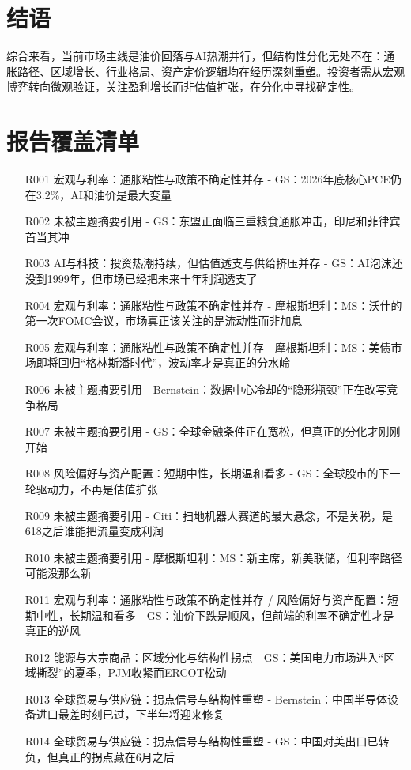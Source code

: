 \documentclass[11pt]{ctexart}
\begin{document}
\section{结语}
综合来看，当前市场主线是油价回落与AI热潮并行，但结构性分化无处不在：通胀路径、区域增长、行业格局、资产定价逻辑均在经历深刻重塑。投资者需从宏观博弈转向微观验证，关注盈利增长而非估值扩张，在分化中寻找确定性。
\newpage
\section{报告覆盖清单}
\begin{itemize}
  \item [R001] 宏观与利率：通胀粘性与政策不确定性并存 - GS：2026年底核心PCE仍在3.2\%，AI和油价是最大变量
  \item [R002] 未被主题摘要引用 - GS：东盟正面临三重粮食通胀冲击，印尼和菲律宾首当其冲
  \item [R003] AI与科技：投资热潮持续，但估值透支与供给挤压并存 - GS：AI泡沫还没到1999年，但市场已经把未来十年利润透支了
  \item [R004] 宏观与利率：通胀粘性与政策不确定性并存 - 摩根斯坦利：MS：沃什的第一次FOMC会议，市场真正该关注的是流动性而非加息
  \item [R005] 宏观与利率：通胀粘性与政策不确定性并存 - 摩根斯坦利：MS：美债市场即将回归“格林斯潘时代”，波动率才是真正的分水岭
  \item [R006] 未被主题摘要引用 - Bernstein：数据中心冷却的“隐形瓶颈”正在改写竞争格局
  \item [R007] 未被主题摘要引用 - GS：全球金融条件正在宽松，但真正的分化才刚刚开始
  \item [R008] 风险偏好与资产配置：短期中性，长期温和看多 - GS：全球股市的下一轮驱动力，不再是估值扩张
  \item [R009] 未被主题摘要引用 - Citi：扫地机器人赛道的最大悬念，不是关税，是618之后谁能把流量变成利润
  \item [R010] 未被主题摘要引用 - 摩根斯坦利：MS：新主席，新美联储，但利率路径可能没那么新
  \item [R011] 宏观与利率：通胀粘性与政策不确定性并存 / 风险偏好与资产配置：短期中性，长期温和看多 - GS：油价下跌是顺风，但前端的利率不确定性才是真正的逆风
  \item [R012] 能源与大宗商品：区域分化与结构性拐点 - GS：美国电力市场进入“区域撕裂”的夏季，PJM收紧而ERCOT松动
  \item [R013] 全球贸易与供应链：拐点信号与结构性重塑 - Bernstein：中国半导体设备进口最差时刻已过，下半年将迎来修复
  \item [R014] 全球贸易与供应链：拐点信号与结构性重塑 - GS：中国对美出口已转负，但真正的拐点藏在6月之后

\end{itemize}
\end{document}
